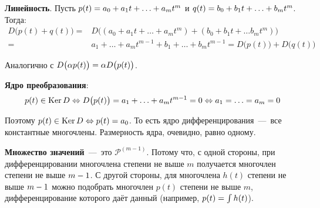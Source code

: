 \documentclass[a4paper,12pt]{article}
\begin{document}
  \begin{solution}
    \textbf{Линейность}. Пусть $p(t) \hm= a_0 \hm+ a_1 t \hm+ \ldots \hm+ a_m t^m$ и $q(t) \hm= b_0 \hm+ b_1 t \hm+ \ldots \hm+ b_m t^m$.
    Тогда:
    \begin{equation*}
    \begin{split}
      D\bigl(p(t) + q(t)\bigr) = &D\bigl((a_0 + a_1 t + \ldots + a_m t^m) + (b_0 + b_1 t + \ldots b_m t^m)\bigr)\\
      = &a_1 + \ldots + a_m t^{m - 1} + b_1 + \ldots + b_m t^{m - 1}
      = D\bigl(p(t)\bigr) + D\bigl(q(t)\bigr)
    \end{split}
    \end{equation*}
    
    Аналогично с $D\bigl(\alpha p(t)\bigr) \hm= \alpha D\bigl(p(t)\bigr)$.
    
    \medskip
    
    \textbf{Ядро преобразования}:
    \[
      p(t) \in \operatorname{Ker} D \Leftrightarrow D\bigl(p(t)\bigr) = a_1 + \ldots + a_m t^{m - 1} = 0 \Leftrightarrow a_1 = \ldots = a_m = 0
    \]
    
    Поэтому $p(t) \in \Ker D \hm\Leftrightarrow p(t) \hm= a_0$.
    То есть ядро дифференцирования~---~все константные многочлены.
    Размерность ядра, очевидно, равно одному.
    
    \medskip
    
    \textbf{Множество значений}~---~это $\mathcal P^{(m - 1)}$.
    Потому что, с одной стороны, при дифференцировании многочлена степени не выше $m$ получается многочлен степени не выше $m \hm- 1$.
    С другой стороны, для многочлена $h(t)$ степени не выше $m \hm- 1$ можно подобрать многочлен $p(t)$ степени не выше $m$, дифференцирование которого даёт данный (например, $p(t) \hm= \int h(t)$).
    
    \medskip
    

\end{solution}
\end{document}
